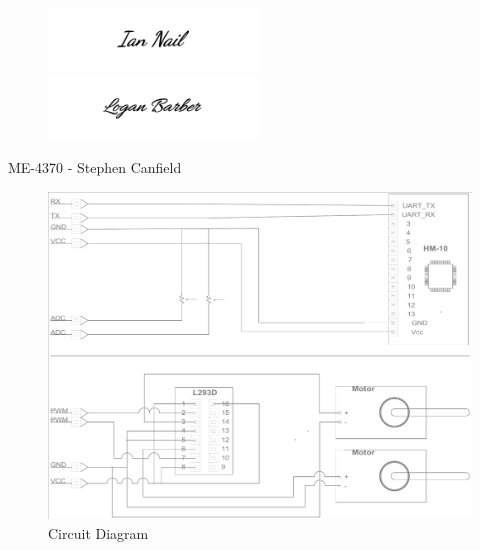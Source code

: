 \documentclass[a4paper,12pt]{article} %
\begin{document}
\maketitle %
\vspace{3cm}

\begin{figure}[h]
\centering
    \includegraphics[width=0.5\textwidth]{IANsignature.png}
    \includegraphics[width=0.5\textwidth]{LOGANsignature.png}
  \end{figure}
\begin{center}
\vspace{3cm}
ME-4370 - Stephen Canfield
\end{center}
\pagebreak



\begin{figure}[h]
  \center
  \includegraphics[width=\textwidth]{AutoCAD.pdf}
  \caption{Circuit Diagram}
  \label{fig:circuitDiagram}
\end{figure}
\end{document}
